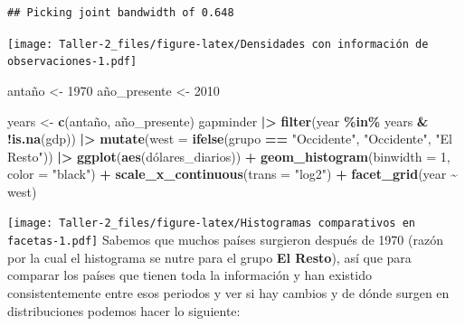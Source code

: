 \documentclass[
]{article}
\newenvironment{Shaded}{\begin{snugshade}}{\end{snugshade}}
\newcommand{\AttributeTok}[1]{\textcolor[rgb]{0.13,0.29,0.53}{#1}}
\newcommand{\DecValTok}[1]{\textcolor[rgb]{0.00,0.00,0.81}{#1}}
\newcommand{\FunctionTok}[1]{\textcolor[rgb]{0.13,0.29,0.53}{\textbf{#1}}}
\newcommand{\NormalTok}[1]{#1}
\newcommand{\OtherTok}[1]{\textcolor[rgb]{0.56,0.35,0.01}{#1}}
\newcommand{\SpecialCharTok}[1]{\textcolor[rgb]{0.81,0.36,0.00}{\textbf{#1}}}
\newcommand{\StringTok}[1]{\textcolor[rgb]{0.31,0.60,0.02}{#1}}
\begin{document}
\begin{verbatim}
## Picking joint bandwidth of 0.648
\end{verbatim}

\texttt{[image: Taller-2\_files/figure-latex/Densidades con información de observaciones-1.pdf]}

\begin{Shaded}
\begin{Highlighting}[]
\NormalTok{antaño }\OtherTok{\textless{}{-}} \DecValTok{1970}
\NormalTok{año\_presente }\OtherTok{\textless{}{-}} \DecValTok{2010}

\NormalTok{years }\OtherTok{\textless{}{-}} \FunctionTok{c}\NormalTok{(antaño, año\_presente)}
\NormalTok{gapminder }\SpecialCharTok{|\textgreater{}}
  \FunctionTok{filter}\NormalTok{(year }\SpecialCharTok{\%in\%}\NormalTok{ years }\SpecialCharTok{\&} \SpecialCharTok{!}\FunctionTok{is.na}\NormalTok{(gdp)) }\SpecialCharTok{|\textgreater{}}
  \FunctionTok{mutate}\NormalTok{(}\AttributeTok{west =} \FunctionTok{ifelse}\NormalTok{(grupo }\SpecialCharTok{==} \StringTok{"Occidente"}\NormalTok{, }\StringTok{"Occidente"}\NormalTok{, }\StringTok{"El Resto"}\NormalTok{)) }\SpecialCharTok{|\textgreater{}}
  \FunctionTok{ggplot}\NormalTok{(}\FunctionTok{aes}\NormalTok{(dólares\_diarios)) }\SpecialCharTok{+}
  \FunctionTok{geom\_histogram}\NormalTok{(}\AttributeTok{binwidth =} \DecValTok{1}\NormalTok{, }\AttributeTok{color =} \StringTok{"black"}\NormalTok{) }\SpecialCharTok{+}
  \FunctionTok{scale\_x\_continuous}\NormalTok{(}\AttributeTok{trans =} \StringTok{"log2"}\NormalTok{) }\SpecialCharTok{+}
  \FunctionTok{facet\_grid}\NormalTok{(year }\SpecialCharTok{\textasciitilde{}}\NormalTok{ west)}
\end{Highlighting}
\end{Shaded}

\texttt{[image: Taller-2\_files/figure-latex/Histogramas comparativos en facetas-1.pdf]}
Sabemos que muchos países surgieron después de 1970 (razón por la cual
el histograma se nutre para el grupo \textbf{El Resto}), así que para
comparar los países que tienen toda la información y han existido
consistentemente entre esos periodos y ver si hay cambios y de dónde
surgen en distribuciones podemos hacer lo siguiente:
\end{document}
